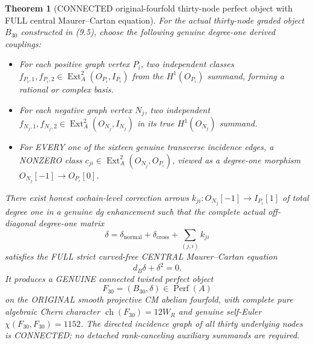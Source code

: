 \documentclass[11pt,a4paper]{article}
\newcommand{\ch}{\operatorname{ch}}
\newtheorem{theorem}{Theorem}[section]
\begin{document}
\begin{theorem}[CONNECTED original-fourfold thirty-node perfect object with FULL central Maurer--Cartan equation]
For the actual
thirty-node
graded object
\(B_{30}\)
constructed in
(9.5), choose
the following
genuine
degree-one
derived couplings:
\begin{itemize}
 \item For each
 positive graph
 vertex \(P_i\),
 two independent
 classes
 \(f_{P_i,1},
 f_{P_i,2}\in
 \operatorname{Ext}^2_A
 (O_{P_i},I_{P_i})\)
 from the
 \(H^1(O_{P_i})\)
 summand, forming
 a rational or
 complex basis.
 \item For each
 negative graph
 vertex \(N_j\),
 two independent
 \(f_{N_j,1},
 f_{N_j,2}\in
 \operatorname{Ext}^2_A
 (O_{N_j},I_{N_j})\)
 in its true
 \(H^1(O_{N_j})\)
 summand.
 \item For EVERY
 one of the
 sixteen genuine
 transverse
 incidence edges,
 a NONZERO class
 \(
 c_{ji}\in
 \operatorname{Ext}^2_A
 (O_{N_j},O_{P_i})
 \),
 viewed as a
 degree-one
 morphism
 \(O_{N_j}[-1]
 \to O_{P_i}[0]\).
\end{itemize}
There exist
honest
cochain-level
correction arrows
\(
 k_{ji}:
 O_{N_j}[-1]
   \to I_{P_i}[1]
\)
of total degree
one in a genuine
dg enhancement
such that the
complete actual
off-diagonal
degree-one matrix
\[
 \boxed{
 \delta=
 \delta_{\mathrm{normal}}
 +\delta_{\mathrm{cross}}
 +\sum_{(j,i)}
                k_{ji}
 }
                                                               \tag{10.5}
\]
satisfies the
FULL strict
curved-free
CENTRAL
Maurer--Cartan
equation
\[
 \boxed{d_B\delta+\delta^2=0.}                  \tag{10.6}
\]
It produces
a GENUINE
connected
twisted perfect
object
\[
 \boxed{
  F_{30}=(B_{30},\delta)
      \in\operatorname{Perf}(A)
 }                                                       \tag{10.7}
\]
on the ORIGINAL
smooth projective
CM abelian
fourfold, with
complete pure
algebraic Chern
character
\(
\ch(F_{30})=12W_R
\)
and genuine
self-Euler
\(\chi(F_{30},F_{30})=1152\).
The directed incidence
graph of all thirty
underlying nodes
is CONNECTED;
no detached
rank-canceling
auxiliary summands
are required.
\end{theorem}
\end{document}
